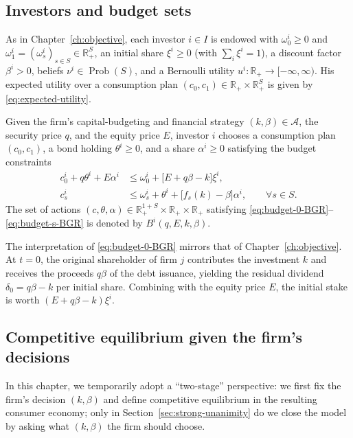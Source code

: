 \documentclass[11pt,a4paper,oneside]{book}
\def\R{\mathbb{R}}
\def\leq{\leqslant}
\def\geq{\geqslant}
\DeclareMathOperator{\Prob}{Prob}
\theoremstyle{plain}
\theoremstyle{definition}
\theoremstyle{remark}
\numberwithin{equation}{chapter}
\begin{document}
\subsection{Investors and budget sets}

As in Chapter~\ref{ch:objective}, each investor $i \in I$ is endowed with $\omega^i_0 \geq 0$ and $\omega^i_1 = (\omega^i_s)_{s \in S} \in \R_+^S$, an initial share $\xi^i \geq 0$ (with $\sum_{i} \xi^i = 1$), a discount factor $\beta^i > 0$, beliefs $\nu^i \in \Prob(S)$, and a Bernoulli utility $u^i : \R_+ \to [-\infty, \infty)$.
His expected utility over a consumption plan $(c_0, c_1) \in \R_+ \times \R_+^S$ is given by \eqref{eq:expected-utility}.

Given the firm's capital-budgeting and financial strategy $(k, \beta) \in \mathcal{A}$, the security price $q$, and the equity price $E$, investor $i$ chooses a consumption plan $(c_0, c_1)$, a bond holding $\theta^i \geq 0$, and a share $\alpha^i \geq 0$ satisfying the budget constraints
\begin{align}
  c^i_0 + q \theta^i + E \alpha^i
  &\leq
  \omega^i_0 + \bigl[ E + q \beta - k \bigr] \xi^i,
  \label{eq:budget-0-BGR}\\[2pt]
  c^i_s
  &\leq
  \omega^i_s + \theta^i + \bigl[ f_s(k) - \beta \bigr] \alpha^i,
  \qquad \forall s \in S.
  \label{eq:budget-s-BGR}
\end{align}
The set of actions $(c, \theta, \alpha) \in \R_+^{1+S} \times \R_+ \times \R_+$ satisfying \eqref{eq:budget-0-BGR}--\eqref{eq:budget-s-BGR} is denoted by $B^i(q, E, k, \beta)$.

The interpretation of \eqref{eq:budget-0-BGR} mirrors that of Chapter~\ref{ch:objective}.
At $t=0$, the original shareholder of firm $j$ contributes the investment $k$ and receives the proceeds $q \beta$ of the debt issuance, yielding the residual dividend $\delta_0 = q \beta - k$ per initial share.
Combining with the equity price $E$, the initial stake is worth $(E + q \beta - k) \xi^i$.

\subsection{Competitive equilibrium given the firm's decisions}

In this chapter, we temporarily adopt a ``two-stage'' perspective: we first fix the firm's decision $(k, \beta)$ and define competitive equilibrium in the resulting consumer economy; only in Section~\ref{sec:strong-unanimity} do we close the model by asking what $(k, \beta)$ the firm should choose.
\end{document}
